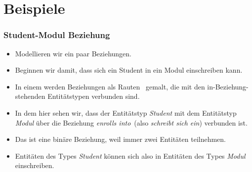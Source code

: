 \documentclass[aspectratio=169,mathserif,notheorems]{beamer}%
\begin{document}
\section{Beispiele}%
%
\begin{frame}[t]%
\frametitle{Student-Modul Beziehung}%
\begin{itemize}%
\item Modellieren wir ein paar Beziehungen.%
\item<2-> Beginnen wir damit, dass sich ein Student in ein Modul einschreiben kann.%
\item<3-> In einem  werden Beziehungen als Rauten~ gemalt, die mit den in-Beziehung-stehenden Entitätstypen verbunden sind.%
\item<5-> In dem  hier sehen wir, dass der Entitätstyp \emph{Student} mit dem Entitätstyp \emph{Modul} über die Beziehung \emph{enrolls into}~(also \emph{schreibt sich ein}) verbunden ist.%
\item<6-> Das ist eine binäre Beziehung, weil immer zwei Entitäten teilnehmen.%
\item<7-> Entitäten des Types \emph{Student} können sich also in Entitäten des Types \emph{Modul} einschreiben.%
\end{itemize}%
%
\end{frame}%
%
\end{document}
